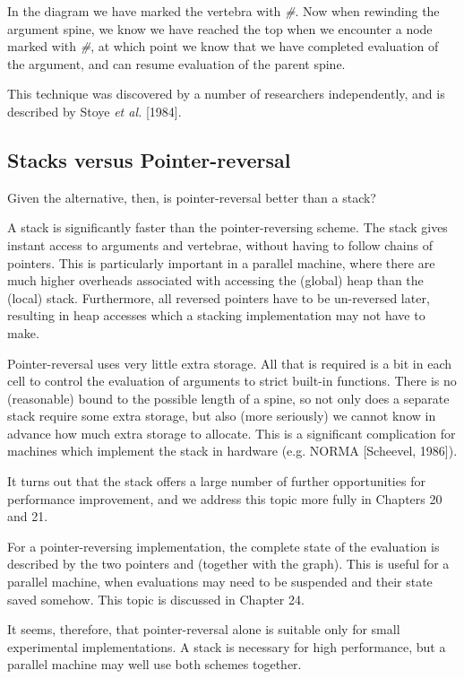 In the diagram we have marked the vertebra with \textit{\#}. Now when rewinding
the argument spine, we know we have reached the top when we encounter a
node marked with \textit{\#}, at which point we know that we have completed
evaluation of the argument, and can resume evaluation of the parent spine.

This technique was discovered by a number of researchers independently,
and is described by Stoye \textit{et al.} [1984].

\subsection{Stacks versus Pointer-reversal}

Given the alternative, then, is pointer-reversal better than a stack?

\begin{numbered}
    \item A stack is significantly faster than the pointer-reversing scheme. The
    stack gives instant access to arguments and vertebrae, without having to
    follow chains of pointers. This is particularly important in a parallel
    machine, where there are much higher overheads associated with
    accessing the (global) heap than the (local) stack. Furthermore, all
    reversed pointers have to be un-reversed later, resulting in heap accesses
    which a stacking implementation may not have to make.

    \item Pointer-reversal uses very little extra storage. All that is required is a bit
    in each cell to control the evaluation of arguments to strict built-in
    functions. There is no (reasonable) bound to the possible length of a
    spine, so not only does a separate stack require some extra storage, but
    also (more seriously) we cannot know in advance how much extra
    storage to allocate. This is a significant complication for machines which
    implement the stack in hardware (e.g. NORMA [Scheevel, 1986]).

    \item It turns out that the stack offers a large number of further opportunities
    for performance improvement, and we address this topic more fully in
    Chapters 20 and 21.

    \item For a pointer-reversing implementation, the complete state of the
    evaluation is described by the two pointers  and  (together with the
    graph). This is useful for a parallel machine, when evaluations may need
    to be suspended and their state saved somehow. This topic is discussed in
    Chapter 24.
\end{numbered}
It seems, therefore, that pointer-reversal alone is suitable only for small
experimental implementations. A stack is necessary for high performance,
but a parallel machine may well use both schemes together.

